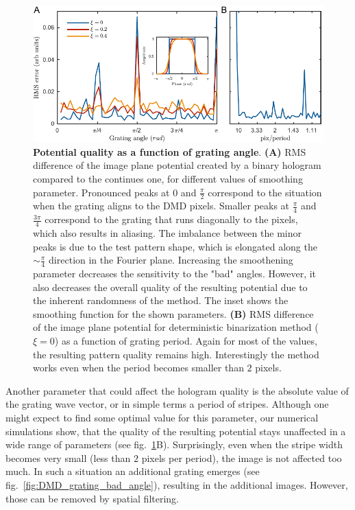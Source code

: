 \begin{figure}[t]
	\centering
	\includegraphics[scale=1]{figures/DMD_K_rotation_v3.pdf}
	\caption{{\bf Potential quality as a function of grating angle}. {\bf (A)} RMS difference of the image plane potential created by a binary hologram compared to the continues one, for different values of smoothing parameter. Pronounced peaks at $0$ and $\frac{\pi}{2}$ correspond to the situation when the grating aligns to the DMD pixels. Smaller peaks at $\frac{\pi}{4}$ and $\frac{3\pi}{4}$ correspond to the grating that runs diagonally to the pixels, which also results in aliasing. The imbalance between the minor peaks is due to the test pattern shape, which is elongated along the $\sim \frac{\pi}{4}$ direction in the Fourier plane. Increasing the smoothening parameter decreases the sensitivity to the "bad" angles. However, it also decreases the overall quality of the resulting potential due to the inherent randomness of the method. The inset shows the smoothing function for the shown parameters. {\bf (B)} RMS difference of the image plane potential for deterministic binarization method ($\xi = 0$) as a function of grating period. Again for most of the values, the resulting pattern quality remains high. Interestingly the method works even when the period becomes smaller than $2$ pixels.}
	\label{fig:DMD_K_rotation}
\end{figure}

Another parameter that could affect the hologram quality is the absolute value of the grating wave vector, or in simple terms a period of stripes. Although one might expect to find some optimal value for this parameter, our numerical simulations show, that the quality of the resulting potential stays unaffected in a wide range of parameters (see fig.~\ref{fig:DMD_K_rotation}B). Surprisingly, even when the stripe width becomes very small (less than $2$ pixels per period),  the image is not affected too much. In such a situation an additional grating emerges (see fig.~\ref{fig:DMD_grating_bad_angle}), resulting in the additional images. However, those can be removed by spatial filtering.

